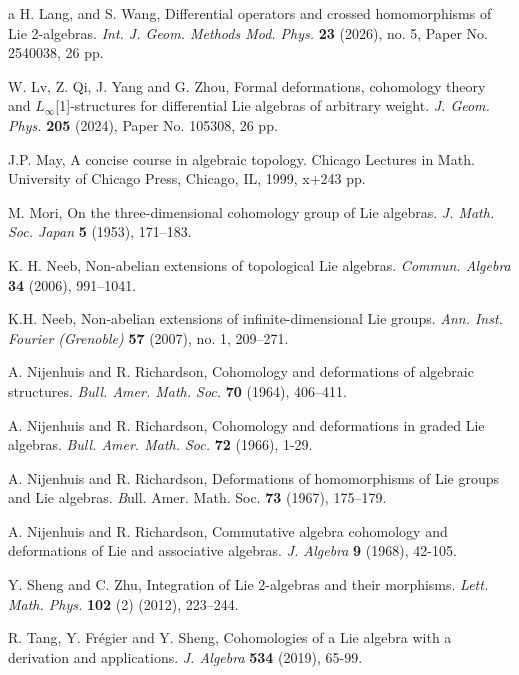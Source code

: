 \documentclass[12pt]{amsart}
\begin{document}
\begin{thebibliography}{a}
H. Lang, and S. Wang, Differential operators and crossed homomorphisms of Lie 2-algebras. \emph{Int. J. Geom. Methods Mod. Phys.} {\bf 23} (2026), no. 5, Paper No. 2540038, 26 pp.

W. Lv, Z. Qi, J. Yang and G. Zhou, Formal deformations, cohomology theory and $L_\infty$[1]-structures for differential Lie algebras of arbitrary weight. \emph{J. Geom. Phys.} {\bf 205} (2024), Paper No. 105308, 26 pp.

J.P. May, A concise course in algebraic topology.
Chicago Lectures in Math. University of Chicago Press, Chicago, IL, 1999, x+243 pp.

M. Mori, On the three-dimensional cohomology group of Lie algebras. \emph{J. Math. Soc. Japan} {\bf 5} (1953), 171–183.

K. H. Neeb, Non-abelian extensions of topological Lie algebras. \emph{Commun. Algebra} {\bf 34} (2006), 991–1041.

K.H. Neeb, Non-abelian extensions of infinite-dimensional Lie groups. \emph{Ann. Inst. Fourier (Grenoble)} {\bf 57} (2007), no. 1, 209–271.

A. Nijenhuis and R. Richardson, Cohomology and deformations of algebraic structures. \emph{Bull. Amer. Math. Soc.} {\bf 70} (1964), 406–411.

 A. Nijenhuis  and R. Richardson,  Cohomology and deformations in graded Lie algebras. {\em Bull. Amer. Math. Soc.} {\bf 72} (1966), 1-29.

A. Nijenhuis and R. Richardson, 
Deformations of homomorphisms of Lie groups and Lie algebras.
{\emph Bull. Amer. Math. Soc.} {\bf 73} (1967), 175–179.

 A. Nijenhuis and R. Richardson,  Commutative  algebra cohomology and deformations of Lie and associative algebras. {\em J. Algebra} {\bf 9} (1968), 42-105.

Y. Sheng and C. Zhu, Integration of Lie 2-algebras and their morphisms. \emph{Lett. Math. Phys.} {\bf 102} (2) (2012), 223–244.

R. Tang, Y. Fr\'egier and Y. Sheng, Cohomologies of a Lie algebra with a derivation and applications. \emph{J. Algebra} {\bf 534} (2019), 65-99.



\end{thebibliography}


 
\end{document}
